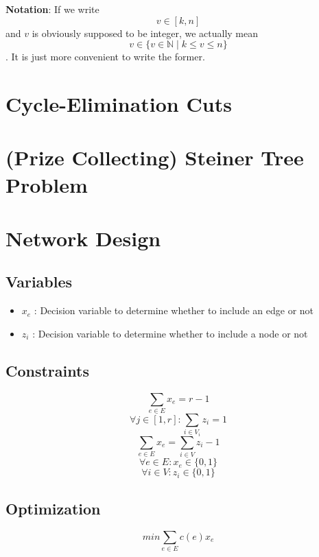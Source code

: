 \documentclass{article}
\begin{document}
\sloppy


\textbf{Notation}: If we write \[ v \in [k,n] \] and $v$ is obviously supposed to be integer, we actually mean \[v \in \{v \in \mathbb{N} \mid k \leq v \leq n\}\]. It is just more convenient to write the former.

\section{Cycle-Elimination Cuts}

\section{(Prize Collecting) Steiner Tree Problem}

\section{Network Design}

\subsection{Variables}
\begin{itemize}
	\item $x_e$ : Decision variable to determine whether to include an edge or not
	\item $z_i$ : Decision variable to determine whether to include a node or not
\end{itemize}

\subsection{Constraints}
\[ \sum_{e\in E}x_e = r-1 \]
\[ \forall j \in [1,r] : \sum_{i\in V_i}z_i = 1 \]
\[ \sum_{e\in E}x_e = \sum_{i\in V}z_i - 1 \]
\[ \forall e \in E : x_e \in \{0,1\} \]
\[ \forall i \in V : z_i \in \{0,1\} \]

\subsection{Optimization}
\[ min \sum_{e\in E}c(e)x_e \]

\clearpage

 

\end{document}
